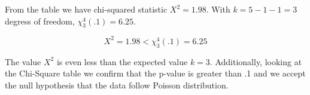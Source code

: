 \documentclass{tufte-book}
\theoremstyle{mytheoremstyle}
\theoremstyle{mylemstyle}
\theoremstyle{mydefstyle}
\begin{document}
From the table we have chi-squared statistic $X^2=1.98$.  With $k=5-1-1=3$ degress of freedom, $\chi_3^4(.1) = 6.25$.

\[ X^2 = 1.98 < \chi_3^4(.1) = 6.25 \]

The value $X^2$ is even less than the expected value $k=3$.  Additionally, looking at the Chi-Square table we confirm that the p-value is greater than .1 and we accept the null hypothesis that the data follow Poisson distribution.
\end{document}
